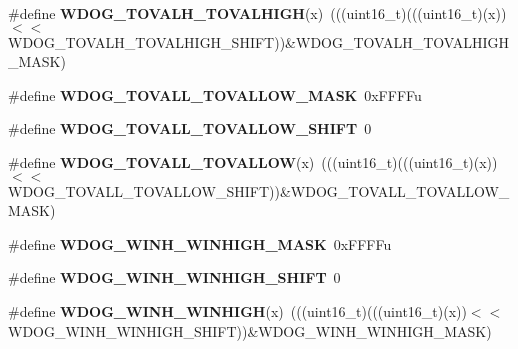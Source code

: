 \begin{DoxyCompactItemize}
\item 
\#define {\bfseries W\+D\+O\+G\+\_\+\+T\+O\+V\+A\+L\+H\+\_\+\+T\+O\+V\+A\+L\+H\+I\+GH}(x)~(((uint16\+\_\+t)(((uint16\+\_\+t)(x))$<$$<$W\+D\+O\+G\+\_\+\+T\+O\+V\+A\+L\+H\+\_\+\+T\+O\+V\+A\+L\+H\+I\+G\+H\+\_\+\+S\+H\+I\+FT))\&W\+D\+O\+G\+\_\+\+T\+O\+V\+A\+L\+H\+\_\+\+T\+O\+V\+A\+L\+H\+I\+G\+H\+\_\+\+M\+A\+SK)\hypertarget{group__WDOG__Register__Masks_ga10c7007564832595b6bd8de07770a9fa}{}\label{group__WDOG__Register__Masks_ga10c7007564832595b6bd8de07770a9fa}

\item 
\#define {\bfseries W\+D\+O\+G\+\_\+\+T\+O\+V\+A\+L\+L\+\_\+\+T\+O\+V\+A\+L\+L\+O\+W\+\_\+\+M\+A\+SK}~0x\+F\+F\+F\+Fu\hypertarget{group__WDOG__Register__Masks_ga71c3913b6be99b211a3c3031caf8ac66}{}\label{group__WDOG__Register__Masks_ga71c3913b6be99b211a3c3031caf8ac66}

\item 
\#define {\bfseries W\+D\+O\+G\+\_\+\+T\+O\+V\+A\+L\+L\+\_\+\+T\+O\+V\+A\+L\+L\+O\+W\+\_\+\+S\+H\+I\+FT}~0\hypertarget{group__WDOG__Register__Masks_ga57ba2617b2855cd4b3d1eb0b3c878f52}{}\label{group__WDOG__Register__Masks_ga57ba2617b2855cd4b3d1eb0b3c878f52}

\item 
\#define {\bfseries W\+D\+O\+G\+\_\+\+T\+O\+V\+A\+L\+L\+\_\+\+T\+O\+V\+A\+L\+L\+OW}(x)~(((uint16\+\_\+t)(((uint16\+\_\+t)(x))$<$$<$W\+D\+O\+G\+\_\+\+T\+O\+V\+A\+L\+L\+\_\+\+T\+O\+V\+A\+L\+L\+O\+W\+\_\+\+S\+H\+I\+FT))\&W\+D\+O\+G\+\_\+\+T\+O\+V\+A\+L\+L\+\_\+\+T\+O\+V\+A\+L\+L\+O\+W\+\_\+\+M\+A\+SK)\hypertarget{group__WDOG__Register__Masks_gae42e2ff7aef835ab2b6fa0d6f7a33476}{}\label{group__WDOG__Register__Masks_gae42e2ff7aef835ab2b6fa0d6f7a33476}

\item 
\#define {\bfseries W\+D\+O\+G\+\_\+\+W\+I\+N\+H\+\_\+\+W\+I\+N\+H\+I\+G\+H\+\_\+\+M\+A\+SK}~0x\+F\+F\+F\+Fu\hypertarget{group__WDOG__Register__Masks_ga6efef6fddbc8b8600a8dee5a24659068}{}\label{group__WDOG__Register__Masks_ga6efef6fddbc8b8600a8dee5a24659068}

\item 
\#define {\bfseries W\+D\+O\+G\+\_\+\+W\+I\+N\+H\+\_\+\+W\+I\+N\+H\+I\+G\+H\+\_\+\+S\+H\+I\+FT}~0\hypertarget{group__WDOG__Register__Masks_ga362e7a13b632027b940135991c9d169b}{}\label{group__WDOG__Register__Masks_ga362e7a13b632027b940135991c9d169b}

\item 
\#define {\bfseries W\+D\+O\+G\+\_\+\+W\+I\+N\+H\+\_\+\+W\+I\+N\+H\+I\+GH}(x)~(((uint16\+\_\+t)(((uint16\+\_\+t)(x))$<$$<$W\+D\+O\+G\+\_\+\+W\+I\+N\+H\+\_\+\+W\+I\+N\+H\+I\+G\+H\+\_\+\+S\+H\+I\+FT))\&W\+D\+O\+G\+\_\+\+W\+I\+N\+H\+\_\+\+W\+I\+N\+H\+I\+G\+H\+\_\+\+M\+A\+SK)\hypertarget{group__WDOG__Register__Masks_gaf5dc50c489d2700bf95ffdfa849f9e24}{}\label{group__WDOG__Register__Masks_gaf5dc50c489d2700bf95ffdfa849f9e24}


\end{DoxyCompactItemize}
